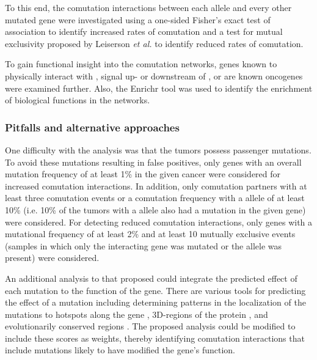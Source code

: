 To this end, the comutation interactions between each \KRAS{} allele and every other mutated gene were investigated using a one-sided Fisher's exact test of association to identify increased rates of comutation and a test for mutual exclusivity proposed by Leiserson \emph{et al.} \cite{Leiserson2016} to identify reduced rates of comutation.

To gain functional insight into the comutation networks, genes known to physically interact with \kras{} \cite{Kovalski2019}, signal up- or downstream of \kras{} \cite{Kanehisa2017, Kanehisa2016KEGGAnnotation.}, or are known oncogenes \cite{Bamford2004TheWebsite., Sondka2018} were examined further.
Also, the Enrichr tool was used to identify the enrichment of biological functions in the networks.


\subsubsection*{Pitfalls and alternative approaches}

One difficulty with the analysis was that the tumors possess passenger mutations.
To avoid these mutations resulting in false positives, only genes with an overall mutation frequency of at least 1\% in the given cancer were considered for increased comutation interactions.
In addition, only comutation partners with at least three comutation events or a comutation frequency with a \KRAS{} allele of at least 10\% (i.e. 10\% of the tumors with a \KRAS{} allele also had a mutation in the given gene) were considered.
For detecting reduced comutation interactions, only genes with a mutational frequency of at least 2\% and at least 10 mutually exclusive events (samples in which only the interacting gene was mutated or the \KRAS{} allele was present) were considered.

An additional analysis to that proposed could integrate the predicted effect of each mutation to the function of the gene.
There are various tools for predicting the effect of a mutation including determining patterns in the localization of the mutations to hotspots along the gene \cite{Carter2009, Dees2012, Lawrence2013, Tamborero2013, Porta-Pardo2014}, 3D-regions of the protein \cite{Reimand2013, Porta-Pardo2015, Mularoni2016, Niu2016, Tokheim2016a, Gao2017a}, and evolutionarily conserved regions \cite{Kumar2009, Adzhubei2010, Reva2011, Carter2013a, Shihab2013}.
The proposed analysis could be modified to include these scores as weights, thereby identifying comutation interactions that include mutations likely to have modified the gene's function.

